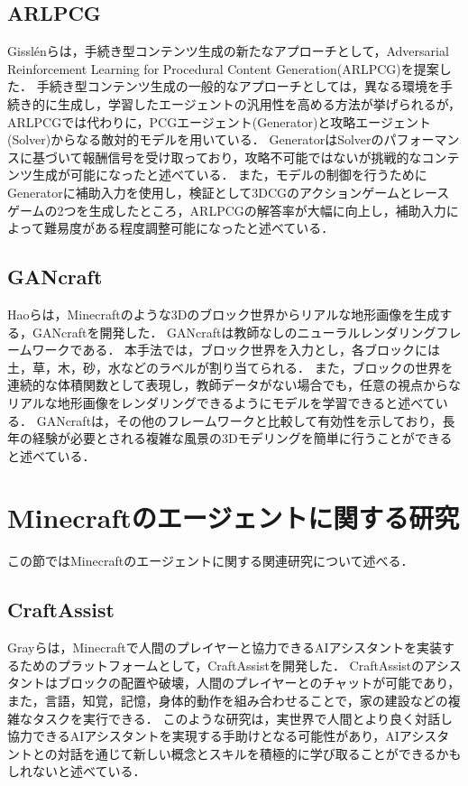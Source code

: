 \subsection{ARLPCG}
Gisslénらは，手続き型コンテンツ生成の新たなアプローチとして，Adversarial Reinforcement Learning for Procedural Content Generation(ARLPCG)を提案した．
手続き型コンテンツ生成の一般的なアプローチとしては，異なる環境を手続き的に生成し，学習したエージェントの汎用性を高める方法が挙げられるが，ARLPCGでは代わりに，PCGエージェント(Generator)と攻略エージェント(Solver)からなる敵対的モデルを用いている．
GeneratorはSolverのパフォーマンスに基づいて報酬信号を受け取っており，攻略不可能ではないが挑戦的なコンテンツ生成が可能になったと述べている．
また，モデルの制御を行うためにGeneratorに補助入力を使用し，検証として3DCGのアクションゲームとレースゲームの2つを生成したところ，ARLPCGの解答率が大幅に向上し，補助入力によって難易度がある程度調整可能になったと述べている．

\subsection{GANcraft}\label{sec:gancraft}
Haoらは，Minecraftのような3Dのブロック世界からリアルな地形画像を生成する，GANcraftを開発した．
GANcraftは教師なしのニューラルレンダリングフレームワークである．
本手法では，ブロック世界を入力とし，各ブロックには土，草，木，砂，水などのラベルが割り当てられる．
また，ブロックの世界を連続的な体積関数として表現し，教師データがない場合でも，任意の視点からなリアルな地形画像をレンダリングできるようにモデルを学習できると述べている．
GANcraftは，その他のフレームワークと比較して有効性を示しており，長年の経験が必要とされる複雑な風景の3Dモデリングを簡単に行うことができると述べている．

\section{Minecraftのエージェントに関する研究}
この節ではMinecraftのエージェントに関する関連研究について述べる．

\subsection{CraftAssist}
Grayらは，Minecraftで人間のプレイヤーと協力できるAIアシスタントを実装するためのプラットフォームとして，CraftAssistを開発した．
CraftAssistのアシスタントはブロックの配置や破壊，人間のプレイヤーとのチャットが可能であり，また，言語，知覚，記憶，身体的動作を組み合わせることで，家の建設などの複雑なタスクを実行できる．
このような研究は，実世界で人間とより良く対話し協力できるAIアシスタントを実現する手助けとなる可能性があり，AIアシスタントとの対話を通じて新しい概念とスキルを積極的に学び取ることができるかもしれないと述べている．


